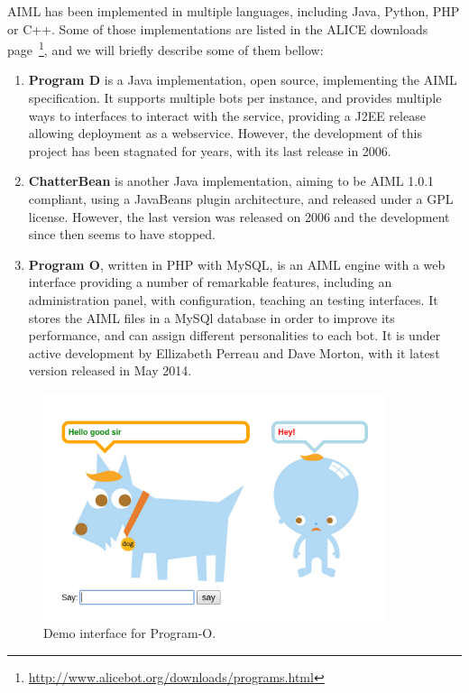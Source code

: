 \ac{AIML} has been implemented in multiple languages, including Java, Python, PHP or C++. Some of those implementations are listed in the ALICE downloads page~\footnote{\url{http://www.alicebot.org/downloads/programs.html}}, and we will briefly describe some of them bellow:

\begin{enumerate}
 \item \textbf{Program D} is a Java implementation, open source, implementing the \ac{AIML} specification. It supports multiple bots per instance, and provides multiple ways to interfaces to interact with the service, providing a J2EE release allowing deployment as a webservice. However, the development of this project has been stagnated for years, with its last release in 2006.
 \item \textbf{ChatterBean} is another Java implementation, aiming to be \ac{AIML} 1.0.1 compliant, using a JavaBeans plugin architecture, and released under a GPL license. However, the last version was released on 2006 and the development since then seems to have stopped.
 \item \textbf{Program O}, written in PHP with MySQL, is an \ac{AIML} engine with a web interface providing a number of remarkable features, including an administration panel, with configuration, teaching an testing interfaces. It stores the \ac{AIML} files in a MySQl database in order to improve its performance, and can assign different personalities to each bot. It is under active development by Ellizabeth Perreau and Dave Morton, with it latest version released in May 2014. 
\end{enumerate}


\begin{figure}[!htbp]
    \centering
    \includegraphics[width=0.9\textwidth]{img/screens/programo.png}
    \caption{Demo interface for Program-O.}
    \label{fig:programo1}
\end{figure}


